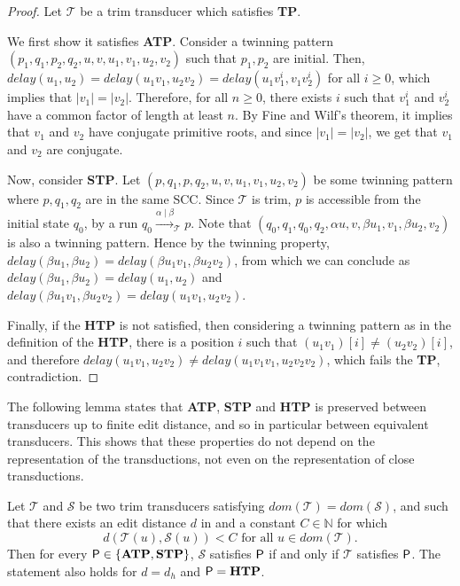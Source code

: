 \documentclass[a4paper,UKenglish,cleveref, autoref, thm-restate,authorcolumns, colorlinks]{lipics-v2021}
\newcommand\dom{\mathit{dom}}
\newcommand\calT{\mathcal{T}}
\newcommand\delay{\mathit{delay}}
\newcommand{\trans}{\mathcal{T}}
\newcommand{\transs}{\mathcal{S}}
\newcommand{\TP}[0]{\textbf{TP}}
\newcommand{\ATP}[0]{\textbf{ATP}}
\newcommand{\STP}[0]{\textbf{STP}}
\newcommand{\HTP}[0]{\textbf{HTP}}
\begin{document}
\begin{proof}
   Let $\calT$ be a trim transducer which satisfies \TP. 


We first show it satisfies \ATP. Consider a twinning pattern $(p_1,q_1,p_2,q_2,u,v,u_1,v_1,u_2,v_2)$ such that $p_1,p_2$ are initial. Then, $\delay(u_1,u_2)=\delay(u_1v_1,u_2v_2) = \delay(u_1v_1^i,v_1v_2^i)$ for all $i\geq 0$, which implies that $|v_1|=|v_2|$. Therefore, for all $n\geq 0$, there exists $i$ such that $v_1^i$ and $v_2^i$ have a common factor of length at least $n$. By Fine and Wilf's theorem, it implies that $v_1$ and $v_2$ have conjugate primitive roots, and since $|v_1|=|v_2|$, we get that $v_1$ and $v_2$ are conjugate. 


Now, consider \STP. Let $(p,q_1,p,q_2,u,v,u_1,v_1,u_2,v_2)$ be some twinning pattern where $p,q_1,q_2$ are in the same SCC. Since $\calT$ is trim, $p$ is accessible from the initial state $q_0$, by a run $q_0\xrightarrow{\alpha\mid \beta}_{\calT} p$. Note that $(q_0,q_1,q_0,q_2,\alpha u, v, \beta u_1,v_1,\beta u_2,v_2)$ is also a twinning pattern. Hence by the twinning property, $\delay(\beta u_1,\beta u_2) = \delay(\beta u_1v_1,\beta u_2v_2)$, from which we can conclude as $\delay(\beta u_1,\beta u_2) = \delay(u_1,u_2)$ and $\delay(\beta u_1v_1,\beta u_2v_2) = \delay(u_1v_1,u_2v_2)$.


Finally, if the \HTP{} is not satisfied, then considering a twinning pattern as in the definition of the \HTP, there is a position $i$ such that $(u_1v_1)[i] \neq (u_2v_2)[i]$, and therefore $\delay(u_1v_1,u_2v_2)\neq \delay(u_1v_1v_1,u_2v_2v_2)$, which fails the \TP, contradiction.
\end{proof}

The following lemma states that \ATP{}, \STP{} and \HTP{} is preserved between transducers up to finite edit distance, and so in particular between equivalent transducers. This shows that these properties do not depend on the representation of the transductions, not even on the representation of close transductions.

\begin{lemma}\label{lem:preserveTPs}
    Let $\trans$ and $\transs$ be two trim transducers
    satisfying $\dom(\trans) = \dom(\transs)$, and
    such that there exists an edit distance $d$ in 
    and a constant $C \in \mathbb{N}$
    for which
    \[
    d(\trans(u),\transs(u))<C \text{ for all $u \in \dom(\trans)$}.
    \]
    Then for every ${\sf P}\in \{\ATP,\STP\}$,
    $\transs$ satisfies ${\sf P}$ if and only if $\trans$ satisfies ${\sf P}$.
    The statement also holds for $d = d_h$ and ${\sf P} = \HTP$.
\end{lemma}
\end{document}
